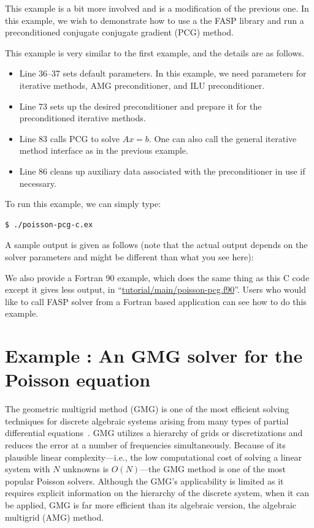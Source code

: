 \documentclass[11pt]{memoir}
\begin{document}
This example is a bit more involved and is a modification of the
previous one. In this example, we wish to demonstrate how to use a the
FASP library and run a preconditioned conjugate conjugate gradient (PCG) method.
%

%
This example is very similar to the first example, and the details are
as follows. 
\begin{itemize}
%
\item Line 36--37 sets default parameters. In this example, we need parameters for iterative methods, AMG preconditioner, and ILU preconditioner. 
%
\item Line 73 sets up the desired preconditioner and prepare it for the preconditioned iterative methods.
%
\item Line 83 calls PCG to solve $Ax=b$. One can also call the general iterative method interface as in the previous example.
%
\item Line 86 cleans up auxiliary data associated with the preconditioner in use if necessary. 
%
\end{itemize}
%
To run this example, we can simply type:
%
\begin{lstlisting}[numbers=none]
$ ./poisson-pcg-c.ex
\end{lstlisting}
%
A sample output is given as follows (note that the actual output depends on the solver parameters and might be different than what you see here):


We also provide a Fortran 90 example, which does the same thing as
this C code except it gives less output, in
``\url{tutorial/main/poisson-pcg.f90}''. Users who would like to call
FASP solver from a Fortran based application can see how to do this example.
%

%

\section{Example : An GMG solver for the Poisson equation}\label{sec:ex4}
\addtocounter{ex}{1}

The geometric multigrid method (GMG) is one of the most efficient solving techniques for discrete algebraic systems arising from many types of partial differential equations~\cite{Bramble.Bramble.1993fk,Trottenberg.TrottenbergOosterlee.2001fu}. GMG utilizes a hierarchy of grids or discretizations and reduces the error at a number of frequencies simultaneously. Because of its plausible linear complexity---i.e., the low computational cost of solving a linear system with $N$ unknowns is $O(N)$---the GMG method is one of the most popular Poisson solvers. Although the GMG's applicability is limited as it requires explicit information on the hierarchy of the discrete system, when it can be applied, GMG is far more efficient than its algebraic version, the algebraic multigrid (AMG) method.
\end{document}
